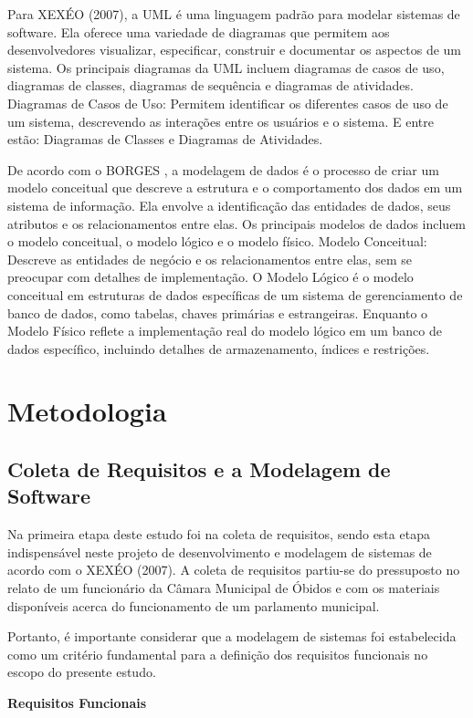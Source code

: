\documentclass[12pt]{article}
\begin{document}
Para XEXÉO (2007), a UML é uma linguagem padrão para modelar sistemas de software. Ela oferece uma variedade de diagramas que permitem aos desenvolvedores visualizar, especificar, construir e documentar os aspectos de um sistema. Os principais diagramas da UML incluem diagramas de casos de uso, diagramas de classes, diagramas de sequência e diagramas de atividades. Diagramas de Casos de Uso: Permitem identificar os diferentes casos de uso de um sistema, descrevendo as interações entre os usuários e o sistema. E entre estão: Diagramas de Classes e Diagramas de Atividades.

De acordo com o BORGES \parencite{de2002modelagem}, a modelagem de dados é o processo de criar um modelo conceitual que descreve a estrutura e o comportamento dos dados em um sistema de informação. Ela envolve a identificação das entidades de dados, seus atributos e os relacionamentos entre elas. Os principais modelos de dados incluem o modelo conceitual, o modelo lógico e o modelo físico. Modelo Conceitual: Descreve as entidades de negócio e os relacionamentos entre elas, sem se preocupar com detalhes de implementação. O Modelo Lógico é o modelo conceitual em estruturas de dados específicas de um sistema de gerenciamento de banco de dados, como tabelas, chaves primárias e estrangeiras. Enquanto o Modelo Físico reflete a implementação real do modelo lógico em um banco de dados específico, incluindo detalhes de armazenamento, índices e restrições.


\section{Metodologia}
\subsection{Coleta de Requisitos e a Modelagem de Software}

Na primeira etapa deste estudo foi na coleta de requisitos, sendo esta etapa indispensável neste projeto de desenvolvimento e modelagem de sistemas de acordo com o XEXÉO (2007). A coleta de requisitos partiu-se do pressuposto no relato de um funcionário da Câmara Municipal de Óbidos e com os materiais disponíveis acerca do funcionamento de um parlamento municipal.

Portanto, é importante considerar que a modelagem de sistemas foi estabelecida como um critério fundamental para a definição dos requisitos funcionais no escopo do presente estudo.

\textbf{Requisitos Funcionais}
\end{document}
